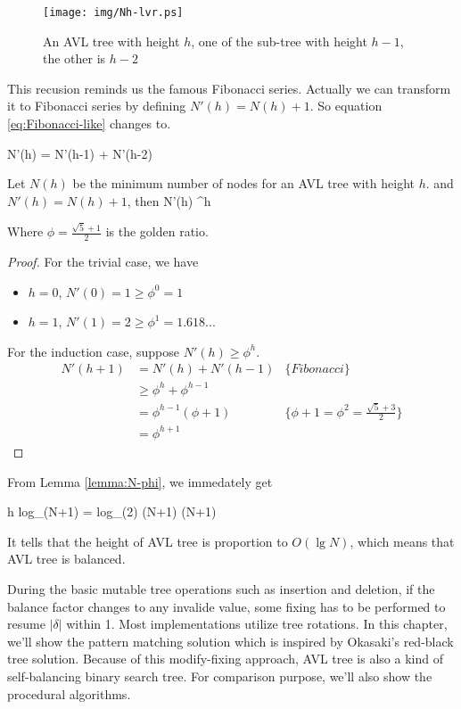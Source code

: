 \documentclass{article}
\begin{document}
\begin{figure}[htbp]
   \centering
   \texttt{[image: img/Nh-lvr.ps]}
   \caption{An AVL tree with height $h$, one of the sub-tree with height $h-1$, the other is $h-2$} \label{fig:N-h-relation}
\end{figure}

This recusion reminds us the famous Fibonacci series. Actually we can 
transform it to Fibonacci series by defining $N'(h) = N(h)+1$. So equation
\ref{eq:Fibonacci-like} changes to.

\be
  N'(h) = N'(h-1) + N'(h-2)
\ee

\begin{lemma}
\label{lemma:N-phi}
Let $N(h)$ be the minimum number of nodes for an AVL tree with
height $h$. and $N'(h) = N(h) + 1$, then
\be
  N'(h) \geq \phi^h
\ee

Where $\phi = \frac{\sqrt{5}+1}{2}$ is the golden ratio.
\end{lemma}

\begin{proof}
For the trivial case, we have
\begin{itemize}
\item $h=0$, $N'(0) = 1 \geq \phi^0 = 1$
\item $h=1$, $N'(1) = 2 \geq \phi^1 = 1.618...$
\end{itemize}

For the induction case, suppose $N'(h) \geq \phi^h$.
\[
  \begin{array}{lll}
  N'(h+1) & = N'(h) + N'(h-1) & \{Fibonacci\} \\
          & \geq \phi^h + \phi^{h-1} & \\
          & = \phi^{h-1}(\phi + 1) & \{\phi + 1 = \phi^2 = \frac{\sqrt{5}+3}{2}\} \\
          & = \phi^{h+1}
 \end{array}
\]
\end{proof}

From Lemma \ref{lemma:N-phi}, we immedately get

\be
  h \leq log_{\phi}(N+1) = log_{\phi}(2) \cdot \lg (N+1)  \lg (N+1)
  \label{eq:AVL-height}
\ee

It tells that the height of AVL tree is proportion to $O(\lg N)$, which
means that AVL tree is balanced.

During the basic mutable tree operations such as insertion and deletion,
if the balance factor changes to any invalide value, some fixing has
to be performed to resume $|\delta|$ within 1. Most implementations utilize
tree rotations. In this chapter, we'll show the pattern matching solution
which is inspired by Okasaki's red-black tree solution\cite{okasaki}.
Because of this modify-fixing approach, AVL tree is also a kind of 
self-balancing binary search tree. For comparison purpose, we'll also
show the procedural algorithms.
\end{document}
